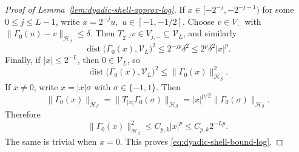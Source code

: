 \documentclass[11pt]{article}
\theoremstyle{definition}
\begin{document}
\begin{proof}[Proof of Lemma~\ref{lem:dyadic-shell-approx-log}]
If $x\in[-2^{-j},-2^{-j-1})$ for some $0\le j\le L-1$, write
\(
x=2^{-j}u,\) \( u\in[-1,-1/2].
\)
Choose $v\in V_-$ with
\(
\|\Gamma_0(u)-v\|_{\mathcal H_\beta}\le \delta.
\)
Then $T_{2^{-j}}v\in V_{j,-}\subseteq \mathcal V_L$, and similarly
\[
\operatorname{dist}\bigl(\Gamma_0(x),\mathcal V_L\bigr)^2
\le
2^{-jp}\delta^2
\le
2^p\delta^2|x|^p.
\]
Finally, if $|x|\le 2^{-L}$, then $0\in\mathcal V_L$, so
\[
\operatorname{dist}\bigl(\Gamma_0(x),\mathcal V_L\bigr)^2
\le
\|\Gamma_0(x)\|_{\mathcal H_\beta}^2.
\]
If $x\neq 0$, write $x=|x|\sigma$ with $\sigma\in\{-1,1\}$. Then
\[
\|\Gamma_0(x)\|_{\mathcal H_\beta}
=
\|T_{|x|}\Gamma_0(\sigma)\|_{\mathcal H_\beta}
=
|x|^{p/2}\|\Gamma_0(\sigma)\|_{\mathcal H_\beta}.
\]
Therefore
\[
\|\Gamma_0(x)\|_{\mathcal H_\beta}^2
\le
C_{p,k}|x|^p
\le
C_{p,k}2^{-Lp}.
\]
The same is trivial when $x=0$. This proves
\eqref{eq:dyadic-shell-bound-log}.
\end{proof}
\end{document}
